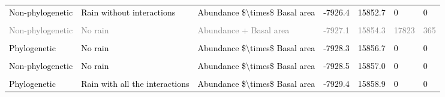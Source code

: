 \documentclass[
  12pt,
  letterpaper,
  DIV=11,
  numbers=noendperiod]{scrartcl}
\begin{document}
\begin{table}[H]
{\begin{tabular}[t]{lllllll}
\addlinespace
\textcolor{black}{Non-phylogenetic} & \textcolor{black}{Rain without interactions} & \textcolor{black}{Abundance \$\textbackslash{}times\$ Basal area} & \textcolor{black}{-7926.4} & \textcolor{black}{15852.7} & \textcolor{black}{0} & \textcolor{black}{0}\\
\cellcolor{gray!6}{\textcolor{black}{Phylogenetic}} & \cellcolor{gray!6}{\textcolor{black}{Rain with all the interactions}} & \cellcolor{gray!6}{\textcolor{black}{Abundance + Basal area}} & \cellcolor{gray!6}{\textcolor{black}{-7926.9}} & \cellcolor{gray!6}{\textcolor{black}{15853.9}} & \cellcolor{gray!6}{\textcolor{black}{0}} & \cellcolor{gray!6}{\textcolor{black}{2}}\\
\textcolor{gray}{Non-phylogenetic} & \textcolor{gray}{No rain} & \textcolor{gray}{Abundance + Basal area} & \textcolor{gray}{-7927.1} & \textcolor{gray}{15854.3} & \textcolor{gray}{17823} & \textcolor{gray}{365}\\
\cellcolor{gray!6}{\textcolor{gray}{Phylogenetic}} & \cellcolor{gray!6}{\textcolor{gray}{No rain}} & \cellcolor{gray!6}{\textcolor{gray}{Abundance + Basal area}} & \cellcolor{gray!6}{\textcolor{gray}{-7927.6}} & \cellcolor{gray!6}{\textcolor{gray}{15855.3}} & \cellcolor{gray!6}{\textcolor{gray}{6266}} & \cellcolor{gray!6}{\textcolor{gray}{108}}\\
\textcolor{black}{Phylogenetic} & \textcolor{black}{No rain} & \textcolor{black}{Abundance \$\textbackslash{}times\$ Basal area} & \textcolor{black}{-7928.3} & \textcolor{black}{15856.7} & \textcolor{black}{0} & \textcolor{black}{0}\\
\addlinespace
\cellcolor{gray!6}{\textcolor{black}{Non-phylogenetic}} & \cellcolor{gray!6}{\textcolor{black}{Rain with all the interactions}} & \cellcolor{gray!6}{\textcolor{black}{Abundance + Basal area}} & \cellcolor{gray!6}{\textcolor{black}{-7928.4}} & \cellcolor{gray!6}{\textcolor{black}{15856.8}} & \cellcolor{gray!6}{\textcolor{black}{0}} & \cellcolor{gray!6}{\textcolor{black}{0}}\\
\textcolor{black}{Non-phylogenetic} & \textcolor{black}{No rain} & \textcolor{black}{Abundance \$\textbackslash{}times\$ Basal area} & \textcolor{black}{-7928.5} & \textcolor{black}{15857.0} & \textcolor{black}{0} & \textcolor{black}{0}\\
\cellcolor{gray!6}{\textcolor{black}{Non-phylogenetic}} & \cellcolor{gray!6}{\textcolor{black}{Rain with all the interactions}} & \cellcolor{gray!6}{\textcolor{black}{Abundance \$\textbackslash{}times\$ Basal area}} & \cellcolor{gray!6}{\textcolor{black}{-7929.1}} & \cellcolor{gray!6}{\textcolor{black}{15858.1}} & \cellcolor{gray!6}{\textcolor{black}{0}} & \cellcolor{gray!6}{\textcolor{black}{0}}\\
\textcolor{black}{Phylogenetic} & \textcolor{black}{Rain with all the interactions} & \textcolor{black}{Abundance \$\textbackslash{}times\$ Basal area} & \textcolor{black}{-7929.4} & \textcolor{black}{15858.9} & \textcolor{black}{0} & \textcolor{black}{0}\\
\bottomrule
\end{tabular}}
\end{table}
\end{document}
